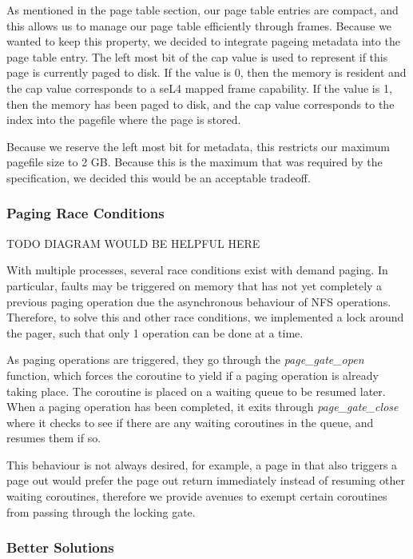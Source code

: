\documentclass[runningheads,a4paper]{llncs}
\begin{document}

As mentioned in the page table section, our page table entries are compact, and this allows us to manage our page table efficiently through frames. Because we wanted to keep this property, we decided to integrate pageing metadata into the page table entry. The left most bit of the cap value is used to represent if this page is currently paged to disk. If the value is 0, then the memory is resident and the cap value corresponds to a seL4 mapped frame capability. If the value is 1, then the memory has been paged to disk, and the cap value corresponds to the index into the pagefile where the page is stored.

Because we reserve the left most bit for metadata, this restricts our maximum pagefile size to 2 GB. Because this is the maximum that was required by the specification, we decided this would be an acceptable tradeoff.

\subsubsection{Paging Race Conditions}

TODO DIAGRAM WOULD BE HELPFUL HERE

With multiple processes, several race conditions exist with demand paging. In particular, faults may be triggered on memory that has not yet completely a previous paging operation due the asynchronous behaviour of NFS operations. Therefore, to solve this and other race conditions, we implemented a lock around the pager, such that only 1 operation can be done at a time.

As paging operations are triggered, they go through the \textit{page\_gate\_open} function, which forces the coroutine to yield if a paging operation is already taking place. The coroutine is placed on a waiting queue to be resumed later. When a paging operation has been completed, it exits through \textit{page\_gate\_close} where it checks to see if there are any waiting coroutines in the queue, and resumes them if so.

This behaviour is not always desired, for example, a page in that also triggers a page out would prefer the page out return immediately instead of resuming other waiting coroutines, therefore we provide avenues to exempt certain coroutines from passing through the locking gate.

\subsubsection{Better Solutions}
\end{document}
